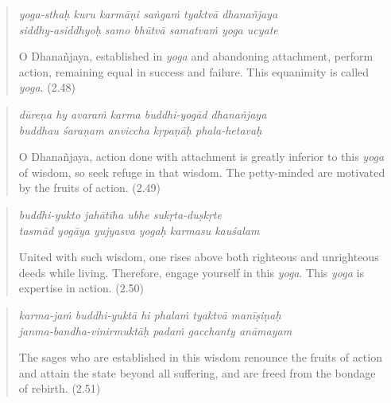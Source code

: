 \documentclass[12pt, twoside, openright]{memoir}
\begin{document}
\par
\begin{verse}
\textit{yoga-sthaḥ kuru karmāṇi saṅgaṁ tyaktvā dhanañjaya} \\
\textit{siddhy-asiddhyoḥ samo bhūtvā samatvaṁ yoga ucyate}

\noindent O Dhanañjaya, established in \textit{yoga} and abandoning attachment, perform action, remaining equal in success and failure. This equanimity is called \textit{yoga}. (2.48)
\end{verse}
\par



\par
\begin{verse}
\textit{dūreṇa hy avaraṁ karma buddhi-yogād dhanañjaya} \\
\textit{buddhau śaraṇam anviccha kṛpaṇāḥ phala-hetavaḥ}

\noindent O Dhanañjaya, action done with attachment is greatly inferior to this \textit{yoga} of wisdom, so seek refuge in that wisdom. The petty-minded are motivated by the fruits of action. (2.49)
\end{verse}
\par



\par
\begin{verse}
\textit{buddhi-yukto jahātīha ubhe sukṛta-duṣkṛte} \\
\textit{tasmād yogāya yujyasva yogaḥ karmasu kauśalam}

\noindent United with such wisdom, one rises above both righteous and unrighteous deeds while living. Therefore, engage yourself in this \textit{yoga}. This \textit{yoga} is expertise in action. (2.50)
\end{verse}
\par



\par
\begin{verse}
\textit{karma-jaṁ buddhi-yuktā hi phalaṁ tyaktvā manīṣiṇaḥ} \\
\textit{janma-bandha-vinirmuktāḥ padaṁ gacchanty anāmayam}

\noindent The sages who are established in this wisdom renounce the fruits of action and attain the state beyond all suffering, and are freed from the bondage of rebirth. (2.51)
\end{verse}
\par
\end{document}
